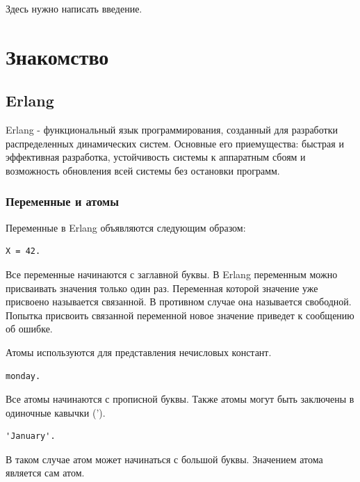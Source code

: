 





\Intro

Здесь нужно написать введение.

\section{Знакомство}
\subsection{Erlang}
Erlang - функциональный язык программирования, созданный для разработки
распределенных динамических систем. Основные его приемущества: быстрая и 
эффективная разработка, устойчивость системы к аппаратным сбоям и 
возможность обновления всей системы без остановки программ.

\subsubsection{Переменные и атомы} 
Переменные в Erlang объявляются следующим образом:
\begin{lstlisting}
X = 42.
\end{lstlisting}
Все переменные начинаются с заглавной буквы. В Erlang переменным 
можно присваивать значения только один раз. Переменная которой 
значение уже присвоено называется связанной. В противном случае 
она называется свободной. Попытка присвоить связанной переменной 
новое значение приведет к сообщению об ошибке.

Атомы используются для представления нечисловых констант. 
\begin{lstlisting}
monday.
\end{lstlisting}
Все атомы начинаются с прописной буквы. Также атомы могут быть 
заключены в одиночные кавычки ('). 
\begin{lstlisting}
'January'.
\end{lstlisting}
В таком случае атом может начинаться с большой буквы.
Значением атома является сам атом.  


